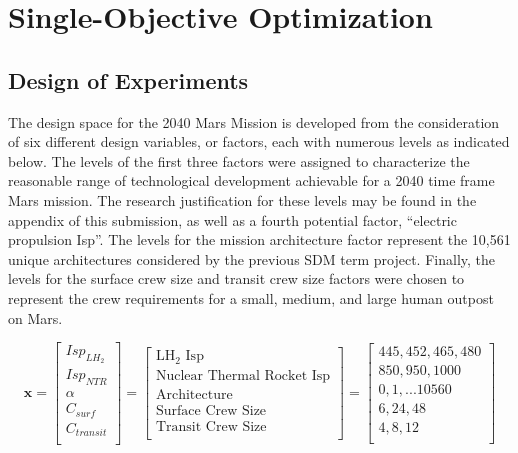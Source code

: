 \documentclass[]{aiaa-pretty}
\begin{document}
\section{Single-Objective Optimization}
\label{sec:single}
\subsection{Design of Experiments}
\label{sec:DOE}
The design space for the 2040 Mars Mission is developed from the consideration of six different design variables, or factors, each with numerous levels as indicated below. The levels of the first three factors were assigned to characterize the reasonable range of technological development achievable for a 2040 time frame Mars mission. The research justification for these levels may be found in the appendix of this submission, as well as a fourth potential factor, “electric propulsion Isp”. The levels for the mission architecture factor represent the 10,561 unique architectures considered by the previous SDM term project. Finally, the levels for the surface crew size and transit crew size factors were chosen to represent the crew requirements for a small, medium, and large human outpost on Mars.

\begin{equation*}
\mathbf{x}=
\begin{bmatrix}
Isp_{LH_2}\\
Isp_{NTR}\\
\alpha\\
C_{surf}\\
C_{transit}\\
\end{bmatrix}
=
\begin{bmatrix}
\mbox{LH}_2\mbox{ Isp}\\
\mbox{Nuclear Thermal Rocket Isp}\\
\mbox{Architecture}\\
\mbox{Surface Crew Size}\\
\mbox{Transit Crew Size}\\
\end{bmatrix}
=
\begin{bmatrix}
445,452,465,480\\
850,950,1000\\
0,1,...10560\\
6,24,48\\
4,8,12\\
\end{bmatrix}
\end{equation*}
\end{document}
